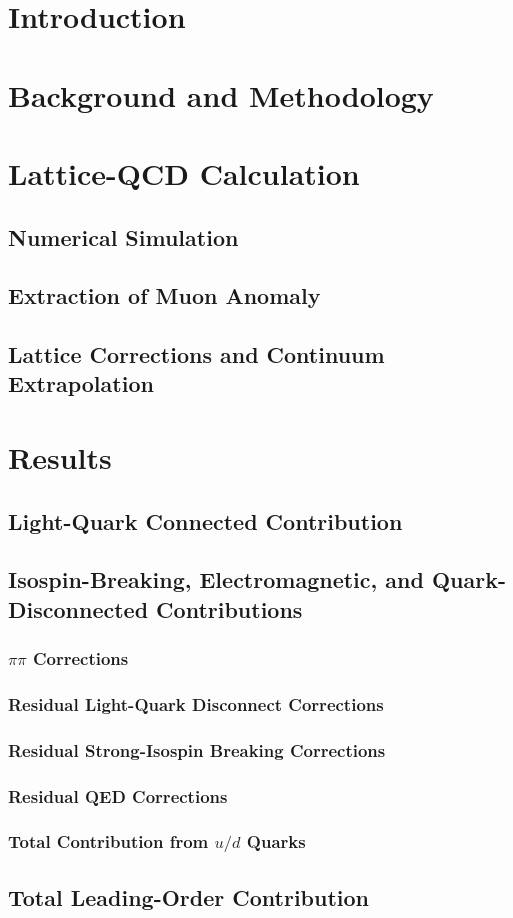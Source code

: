\documentclass[
a4paper,
10pt,
twoside,
prd,
aps,
nofootinbib,
superscriptaddress,
floatfix,
preprintnumbers,
]{article}
\begin{document}
\titleinf
\maketitle
\startmcols

\section{Introduction}
\section{Background and Methodology}

\section{Lattice-QCD Calculation}
\subsection{Numerical Simulation}
\subsection{Extraction of Muon Anomaly}
\subsection{Lattice Corrections and Continuum Extrapolation}


\section{Results}
\subsection{Light-Quark Connected Contribution}
\subsection{Isospin-Breaking, Electromagnetic, and Quark-Disconnected Contributions}
\subsubsection{$\pi\pi$ Corrections}
\subsubsection{Residual Light-Quark Disconnect Corrections}
\subsubsection{Residual Strong-Isospin Breaking Corrections}
\subsubsection{Residual QED Corrections}
\subsubsection{Total Contribution from $u/d$ Quarks}

\subsection{Total Leading-Order Contribution}

\nocite{*}
\printbib

\stopmcols
\end{document}
